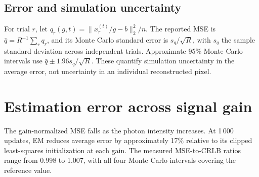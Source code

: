 \documentclass[11pt,a4paper]{article}
\newcommand{\sectionpage}[2]{\clearpage\section{#1}\label{#2}}
\begin{document}
\subsection*{Error and simulation uncertainty}
For trial $r$, let $q_r(g,t)=\|x_r^{(t)}/g-b\|_2^2/n$. The reported MSE is $\bar q=R^{-1}\sum_rq_r$, and its Monte Carlo standard error is $s_q/\sqrt R$, with $s_q$ the sample standard deviation across independent trials. Approximate 95\% Monte Carlo intervals use $\bar q\pm1.96s_q/\sqrt R$. These quantify simulation uncertainty in the average error, not uncertainty in an individual reconstructed pixel.

\sectionpage{Estimation error across signal gain}{sec:results}
The gain-normalized MSE falls as the photon intensity increases. At 1\,000 updates, EM reduces average error by approximately 17\% relative to its clipped least-squares initialization at each gain. The measured MSE-to-CRLB ratios range from 0.998 to 1.007, with all four Monte Carlo intervals covering the reference value.
\end{document}
